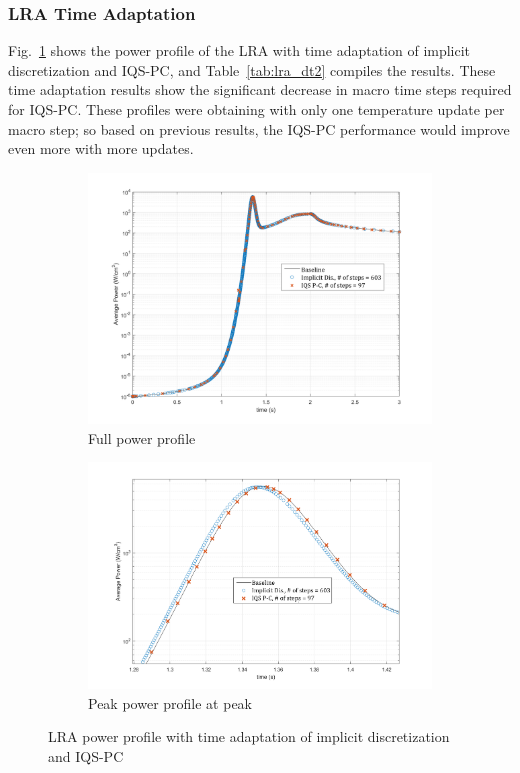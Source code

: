 \documentclass{elsarticle}
\newcommand{\fig}[1]{Fig.~\ref{#1}}                      %
\newcommand{\tbl}[1]{Table~\ref{#1}}                     %
\newcommand{\iqspc}{IQS-PC\xspace}
\begin{document}
\subsubsection{LRA Time Adaptation}

\fig{fig:lra_dt2} shows the power profile of the LRA with time adaptation of implicit discretization and \iqspc, and \tbl{tab:lra_dt2} compiles the results. These time adaptation results show the significant decrease in macro time steps required for \iqspc. These profiles were obtaining with only one temperature update per macro step; so based on previous results, the \iqspc performance would improve even more with more updates.

\begin{figure}[!htbp]
\centering
\begin{subfigure}[!htbp]{0.49\textwidth}
\includegraphics[width=\textwidth]{figures/LRA_DT2.png}
\caption{Full power profile}
\end{subfigure}
\begin{subfigure}[!htbp]{0.49\textwidth}
\includegraphics[width=\textwidth]{figures/LRA_DT2_peak.png}
\caption{Peak power profile at peak}
\end{subfigure}
\caption{LRA power profile with time adaptation of implicit discretization and \iqspc}
\label{fig:lra_dt2}
\end{figure}
\end{document}
